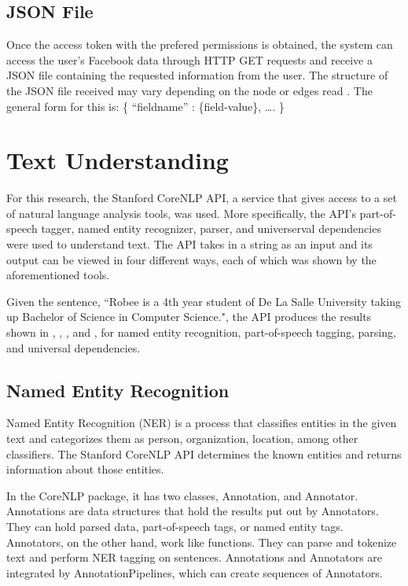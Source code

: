 \subsection{JSON File}
Once the access token with the prefered permissions is obtained, the system can access the user's Facebook data through HTTP GET requests and receive a JSON file containing the requested information from the user.  The structure of the JSON file received may vary depending on the node or edges read \cite{FacebookGraphAndroid2016}. The general form for this is:
	\{
		 ``fieldname'' : \{field-value\}, ….
	\}
	
\section{Text Understanding}
For this research, the Stanford CoreNLP API, a service that gives access to a set of natural language analysis tools, was used. More specifically, the API's part-of-speech tagger, named entity recognizer, parser, and universerval dependencies were used to understand text. The API takes in a string as an input and its output can be viewed in four different ways, each of which was shown by the aforementioned tools.

Given the sentence, ``Robee is a 4th year student of De La Salle University taking up Bachelor of Science in Computer Science.", the API produces the results shown in , , , and , for named entity recognition, part-of-speech tagging, parsing, and universal dependencies.

\subsection{Named Entity Recognition}
Named Entity Recognition (NER) is a process that classifies entities in the given text and categorizes them as person, organization, location, among other classifiers. The Stanford CoreNLP API determines the known entities and returns information about those entities. 

In the CoreNLP package, it has two classes, Annotation, and Annotator. Annotations are data structures that hold the results put out by Annotators. They can hold parsed data, part-of-speech tags, or named entity tags. Annotators, on the other hand, work like functions. They can parse and tokenize text and perform NER tagging on sentences. Annotations and Annotators are integrated by AnnotationPipelines, which can create sequences of Annotators. 

